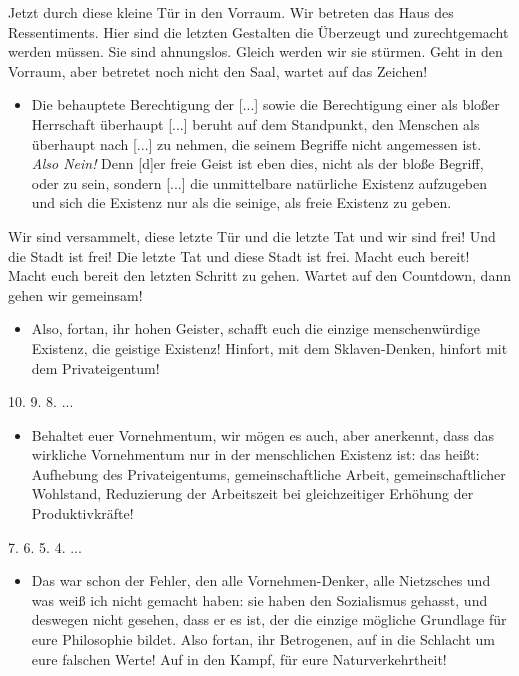 \documentclass[a4paper, 12pt]{report}
\begin{document}
Jetzt durch diese kleine Tür in den Vorraum. 
Wir betreten das Haus des Ressentiments. 
Hier sind die letzten Gestalten die Überzeugt und zurechtgemacht werden müssen. 
Sie sind ahnungslos. 
Gleich werden wir sie stürmen. 
Geht in den Vorraum, aber betretet noch nicht den Saal, wartet auf das Zeichen!

\begin{itemize}\em
\item[] Die behauptete Berechtigung der  [...] sowie die Berechtigung einer  als bloßer Herrschaft überhaupt [...] beruht auf dem Standpunkt, den Menschen als  überhaupt nach  [...] zu nehmen, die seinem Begriffe nicht angemessen ist.\\
    \emph{Also Nein!} Denn [d]er freie Geist ist eben dies, nicht als der bloße Begriff, oder  zu sein, sondern [...] die unmittelbare natürliche Existenz aufzugeben und sich die Existenz nur als die seinige, als freie Existenz zu geben.
\end{itemize}

Wir sind versammelt, diese letzte Tür und die letzte Tat und wir sind frei! 
Und die Stadt ist frei!
Die letzte Tat und diese Stadt ist frei. 
Macht euch bereit! 
Macht euch bereit den letzten Schritt zu gehen. 
Wartet auf den Countdown, dann gehen wir gemeinsam!\\

\begin{itemize}\em
\item[] Also, fortan, ihr hohen Geister, schafft euch die einzige menschenwürdige Existenz, die geistige Existenz!
    Hinfort, mit dem Sklaven-Denken, hinfort mit dem Privateigentum! 
\end{itemize}

10. 9. 8. ...

\begin{itemize}\em
\item[] Behaltet euer Vornehmentum, wir mögen es auch, aber anerkennt, dass das wirkliche Vornehmentum nur in der menschlichen Existenz ist:
    das heißt: Aufhebung des Privateigentums, gemeinschaftliche Arbeit, gemeinschaftlicher Wohlstand, Reduzierung der Arbeitszeit bei gleichzeitiger Erhöhung der Produktivkräfte!
\end{itemize}

7. 6. 5. 4. ...

\begin{itemize}\em
\item[] Das war schon der Fehler, den alle Vornehmen-Denker, alle Nietzsches und was weiß ich nicht gemacht haben: sie haben den Sozialismus gehasst, und deswegen nicht gesehen, dass er es ist, der die einzige mögliche Grundlage für eure Philosophie bildet.
    Also fortan, ihr Betrogenen, auf in die Schlacht um eure falschen Werte!
    Auf in den Kampf, für eure Naturverkehrtheit!
\end{itemize}
\end{document}
